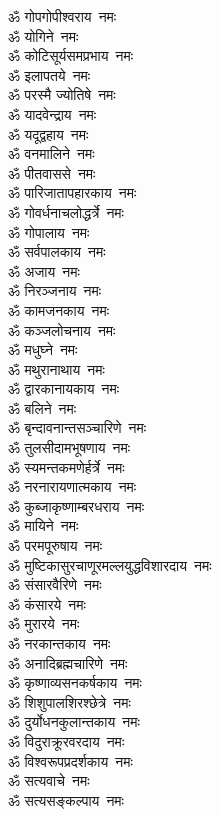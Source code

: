 \begin{multicols}{2}
\begin{flushleft}
ॐ गोपगोपीश्वराय~नमः\\
ॐ योगिने~नमः\\
ॐ कोटिसूर्यसमप्रभाय~नमः\hfill{}\\
ॐ इलापतये~नमः\\
ॐ परस्मै ज्योतिषे~नमः\\
ॐ यादवेन्द्राय~नमः\\
ॐ यदूद्वहाय~नमः\\
ॐ वनमालिने~नमः\\
ॐ पीतवाससे~नमः\\
ॐ पारिजातापहारकाय~नमः\\
ॐ गोवर्धनाचलोद्धर्त्रे~नमः\\
ॐ गोपालाय~नमः\\
ॐ सर्वपालकाय~नमः\hfill{}\\
ॐ अजाय~नमः\\
ॐ निरञ्जनाय~नमः\\
ॐ कामजनकाय~नमः\\
ॐ कञ्जलोचनाय~नमः\\
ॐ मधुघ्ने~नमः\\
ॐ मथुरानाथाय~नमः\\
ॐ द्वारकानायकाय~नमः\\
ॐ बलिने~नमः\\
ॐ बृन्दावनान्तसञ्चारिणे~नमः\\
ॐ तुलसीदामभूषणाय~नमः\hfill{}\\
ॐ स्यमन्तकमणेर्हर्त्रे~नमः\\
ॐ नरनारायणात्मकाय~नमः\\
ॐ कुब्जाकृष्णाम्बरधराय~नमः\\
ॐ मायिने~नमः\\
ॐ परमपूरुषाय~नमः\\
ॐ मुष्टिकासुरचाणूर\-मल्लयुद्ध\-विशारदाय~नमः\\
ॐ संसारवैरिणे~नमः\\
ॐ कंसारये~नमः\\
ॐ मुरारये~नमः\\
ॐ नरकान्तकाय~नमः\hfill{}\\
ॐ अनादिब्रह्मचारिणे~नमः\\
ॐ कृष्णाव्यसनकर्षकाय~नमः\\
ॐ शिशुपालशिरश्छेत्रे~नमः\\
ॐ दुर्योधनकुलान्तकाय~नमः\\
ॐ विदुराक्रूरवरदाय~नमः\\
ॐ विश्वरूपप्रदर्शकाय~नमः\\
ॐ सत्यवाचे~नमः\\
ॐ सत्यसङ्कल्पाय~नमः\\

\end{flushleft}
\end{multicols}
